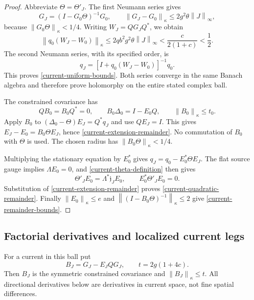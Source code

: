 \documentclass[11pt]{article}
\theoremstyle{remark}
\newcommand{\norm}[1]{\left\|#1\right\|}
\begin{document}
\begin{proof}
Abbreviate $\Theta=\Theta'_J$. The first Neumann series gives
\[
 G_J=(I-G_0\Theta)^{-1}G_0,
 \qquad
 \norm{G_J-G_0}_\kappa\le2g^2\theta\norm{J}_\infty,
\]
because $\norm{G_0\Theta}_\kappa<1/4$.
Writing $W_J=QG_JQ^*$, we obtain
\[
 \norm{q_0(W_J-W_0)}_\kappa
 \le2qb^2g^2\theta\norm{J}_\infty
 <\frac{c}{2(1+c)}<\frac12.
\]
The second Neumann series, with its specified order, is
\[
 q_J=[I+q_0(W_J-W_0)]^{-1}q_0.
\]
This proves \eqref{current-uniform-bounds}. Both series converge in
the same Banach algebra and therefore prove holomorphy on the entire
stated complex ball.

The constrained covariance has
\[
 QB_0=B_0Q^*=0,\qquad
 B_0\Delta_0=I-E_0Q,\qquad
 \norm{B_0}_\kappa\le t_0.
\]
Apply $B_0$ to
$(\Delta_0-\Theta)E_J=Q^*q_J$ and use $QE_J=I$. This gives
$E_J-E_0=B_0\Theta E_J$, hence
\eqref{current-extension-remainder}. No commutation of $B_0$ with
$\Theta$ is used. The chosen radius has
$\norm{B_0\Theta}_\kappa<1/4$.

Multiplying the stationary equation by $E_0^*$ gives
$q_J=q_0-E_0^*\Theta E_J$. The flat source gauge implies
$\Lambda E_0=0$, and \eqref{current-theta-definition} then gives
\begin{equation}
 \Theta'_JE_0=\Lambda^*\mathfrak j_JE_0,
 \qquad E_0^*\Theta'_JE_0=0.
 \label{current-linear-cancellation}
\end{equation}
Substitution of \eqref{current-extension-remainder} proves
\eqref{current-quadratic-remainder}. Finally
$\norm{E_0}_\kappa\le e$ and
$\norm{(I-B_0\Theta)^{-1}}_\kappa\le2$ give
\eqref{current-remainder-bounds}.
\end{proof}

\subsection{Factorial derivatives and localized current legs}
\label{current-derivatives-section}

For a current in this ball put
\begin{equation}
 B_J=G_J-E_JQG_J,
 \qquad t=2g(1+4c).
 \label{current-BJ}
\end{equation}
Then $B_J$ is the symmetric constrained covariance and
$\norm{B_J}_\kappa\le t$. All directional derivatives below are
derivatives in current space, not fine spatial differences.
\end{document}
